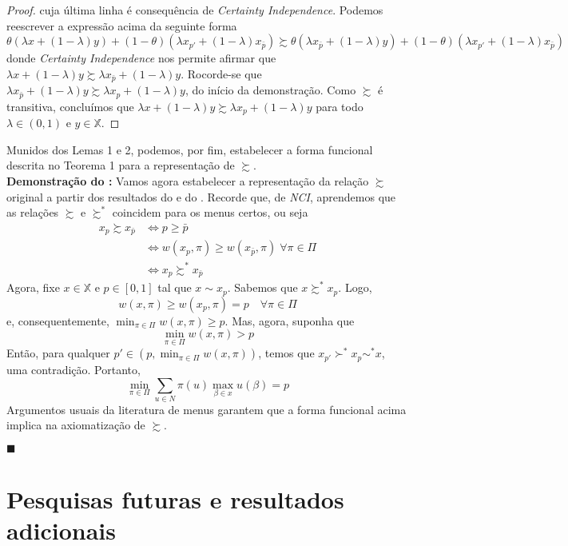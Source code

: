 \documentclass[12pt, a4paper]{article}
\theoremstyle{nonumberplain}
\newtheorem{proof}{Dem.}
\theoremstyle{plain}
\theoremstyle{plain}
\theoremstyle{plain}
\theoremstyle{nonumberplain}
\begin{document}
\begin{proof}
cuja última linha é consequência de \emph{Certainty Independence}. Podemos reescrever a expressão acima da seguinte forma
$$ \theta (\lambda x + (1-\lambda)y)+(1-\theta)(\lambda x_{p'}+(1-\lambda)x_{\bar{p}}) \succsim \theta (\lambda x_{\bar{p}} + (1-\lambda)y)+(1-\theta)(\lambda x_{p'}+(1-\lambda)x_{\bar{p}})$$
donde \emph{Certainty Independence} nos permite afirmar que $\lambda x + (1-\lambda)y\succsim \lambda x_{\bar{p}} + (1-\lambda)y$. Rocorde-se que $\lambda x_{\bar{p}} + (1-\lambda)y\succsim \lambda x_p + (1-\lambda)y$, do início da demonstração. Como $\succsim$ é transitiva, concluímos que $\lambda x + (1-\lambda)y\succsim \lambda x_p + (1-\lambda)y$ para todo $\lambda \in (0,1)$ e $y\in \mathbb{X}$.
\end{proof}

Munidos dos Lemas 1 e 2, podemos, por fim, estabelecer a forma funcional descrita no Teorema 1 para a representação de $\succsim$. \\

\noindent
\textbf{Demonstração do :} Vamos agora estabelecer a representação da relação $\succsim$ original a partir dos resultados do  e do . Recorde que, de \emph{NCI}, aprendemos que as relações $\succsim$ e $\succsim^*$ coincidem para os menus certos, ou seja
\begin{align*}
x_p\succsim x_{\bar{p}}&\Leftrightarrow p\geq \bar{p}\\
&\Leftrightarrow w(x_p,\pi)\geq w(x_{\bar{p}},\pi)\; \forall\pi\in\Pi \\
&\Leftrightarrow x_p\succsim^* x_{\bar{p}}
\end{align*}
Agora, fixe $x\in \mathbb{X}$ e $p\in[0,1]$ tal que $x\sim x_p$. Sabemos que $x\succsim^* x_p$. Logo, $$w(x,\pi)\geq w(x_p,\pi)=p\quad\forall\pi \in \Pi$$ e, consequentemente, $\min_{\pi\in\Pi}w(x,\pi)\geq p$. Mas, agora, suponha que $$\min_{\pi\in\Pi}w(x,\pi)> p$$ Então, para qualquer $p'\in (p,\min_{\pi\in\Pi}w(x,\pi))$, temos que $x_{p'}\succ^* x_p\sim^* x$, uma contradição. Portanto, $$\min_{\pi\in\Pi}\sum_{u\in N} \pi(u)\max_{\beta\in x}u(\beta)=p$$
Argumentos usuais da literatura de menus garantem que a forma funcional acima implica na axiomatização de $\succsim$.
\begin{flushright}
$\blacksquare$
\end{flushright}

\section{Pesquisas futuras e resultados adicionais}
\end{document}
